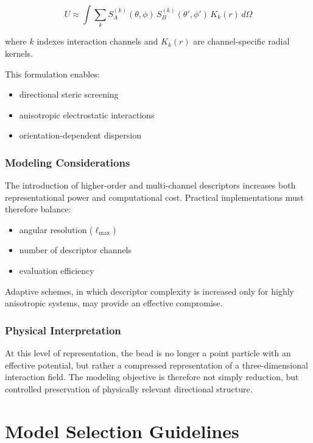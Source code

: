 \documentclass[11pt]{article}
\begin{document}
\begin{equation}
U \approx \int
\sum_k S_A^{(k)}(\theta,\phi)\, S_B^{(k)}(\theta',\phi')\, K_k(r)\, d\Omega
\end{equation}

where $k$ indexes interaction channels and $K_k(r)$ are channel-specific radial kernels.

This formulation enables:
\begin{itemize}
    \item directional steric screening
    \item anisotropic electrostatic interactions
    \item orientation-dependent dispersion
\end{itemize}

\subsubsection{Modeling Considerations}

The introduction of higher-order and multi-channel descriptors increases both representational power and computational cost. Practical implementations must therefore balance:

\begin{itemize}
    \item angular resolution ($\ell_{\max}$)
    \item number of descriptor channels
    \item evaluation efficiency
\end{itemize}

Adaptive schemes, in which descriptor complexity is increased only for highly anisotropic systems, may provide an effective compromise.

\subsubsection{Physical Interpretation}

At this level of representation, the bead is no longer a point particle with an effective potential, but rather a compressed representation of a three-dimensional interaction field. The modeling objective is therefore not simply reduction, but controlled preservation of physically relevant directional structure.

\section{Model Selection Guidelines}
\end{document}
